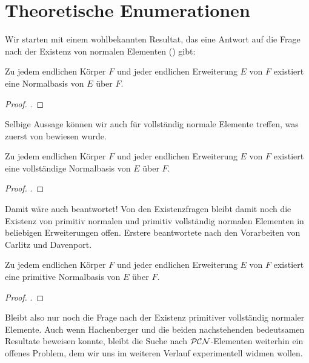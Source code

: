\section{Theoretische Enumerationen}


Wir starten mit einem wohlbekannten Resultat, das eine Antwort auf die Frage
nach der Existenz von normalen Elementen () gibt:

\begin{satz}
  Zu jedem endlichen Körper $F$ und jeder endlichen Erweiterung $E$ von $F$
  existiert eine Normalbasis von $E$ über $F$.
\end{satz}
\begin{proof}
  \autocite[Theorem 2.35]{lidl1997finite}.
\end{proof}

Selbige Aussage können wir auch für vollständig normale Elemente treffen, was
zuerst \citeyear{blessenohl1986} von \citeauthor{blessenohl1986}
\autocite{blessenohl1986} bewiesen wurde.

\begin{satz}
  Zu jedem endlichen Körper $F$ und jeder endlichen Erweiterung $E$ von $F$
  existiert eine vollständige Normalbasis von $E$ über $F$.
\end{satz}
\begin{proof}
  \autocite[Satz 1.2]{blessenohl1986}.
\end{proof}


Damit wäre auch  beantwortet! Von den Existenzfragen bleibt
damit noch die Existenz von primitiv normalen und primitiv vollständig normalen
Elementen in beliebigen Erweiterungen offen. Erstere beantwortete
\citeauthor{lenstra1987} \citeyear{lenstra1987} \autocite{lenstra1987}
nach den Vorarbeiten von Carlitz und Davenport.

\begin{satz}
  Zu jedem endlichen Körper $F$ und jeder endlichen Erweiterung $E$ von $F$
  existiert eine primitive Normalbasis von $E$ über $F$.
\end{satz}
\begin{proof}
  \autocite{lenstra1987}.
\end{proof}


Bleibt also nur noch die Frage nach der Existenz primitiver vollständig
normaler Elemente. Auch wenn Hachenberger 
\citeyear{hachenberger2001} \autocite{hachenberger2001} und 
\citeyear{hachenberger2014} \autocite{hachenberger2014} die beiden
nachstehenden bedeutsamen Resultate beweisen konnte, bleibt die Suche nach 
$\mathcal{PCN}$-Elementen weiterhin ein offenes Problem, dem wir uns im weiteren Verlauf
experimentell widmen wollen.

